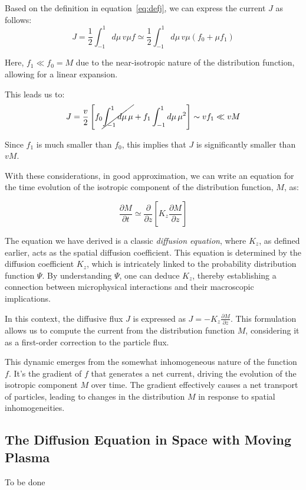 Based on the definition in equation~\eqref{eq:defj}, we can express the current \( J \) as follows:
%
\begin{equation}
J = \frac{1}{2} \int_{-1}^1 d\mu \, v\mu f \simeq \frac{1}{2} \int_{-1}^1 d\mu \, v\mu (f_0 + \mu f_1) 
\end{equation}

Here, \( f_1 \ll f_0 = M \) due to the near-isotropic nature of the distribution function, allowing for a linear expansion.

This leads us to:
%
\begin{equation}
J = \frac{v}{2} \left[ f_0 \cancel{\int_{-1}^1 d\mu \, \mu} + f_1 \int_{-1}^1 d\mu \, \mu^2 \right] \sim v f_1 \ll v M
\end{equation}

Since \( f_1 \) is much smaller than \( f_0 \), this implies that \( J \) is significantly smaller than \( vM \).

With these considerations, in good approximation, we can write an equation for the time evolution of the isotropic component of the distribution function, \( M \), as:
%
\begin{remark}
\begin{equation}
\frac{\partial M}{\partial t} \simeq \frac{\partial}{\partial z}\left[K_z \frac{\partial M}{\partial z}  \right]
\end{equation}
\end{remark}

The equation we have derived is a classic \emph{diffusion equation}, where \( K_z \), as defined earlier, acts as the spatial diffusion coefficient. This equation is determined by the diffusion coefficient \( K_z \), which is intricately linked to the probability distribution function \( \Psi \). By understanding \( \Psi \), one can deduce \( K_z \), thereby establishing a connection between microphysical interactions and their macroscopic implications.

In this context, the diffusive flux \( J \) is expressed as \( J = -K_z \frac{\partial M}{\partial z} \). This formulation allows us to compute the current from the distribution function \( M \), considering it as a first-order correction to the particle flux. 

This dynamic emerges from the somewhat inhomogeneous nature of the function \( f \). It's the gradient of \( f \) that generates a net current, driving the evolution of the isotropic component \( M \) over time. The gradient effectively causes a net transport of particles, leading to changes in the distribution \( M \) in response to spatial inhomogeneities.

\subsection{The Diffusion Equation in Space with Moving Plasma}

{\color{red}To be done}
